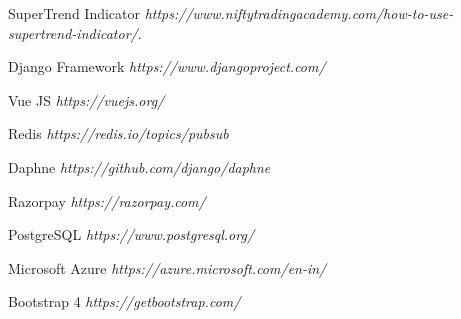 


\begin{thebibliography}{}
\thispagestyle{empty}
SuperTrend Indicator
\emph{https://www.niftytradingacademy.com/how-to-use-supertrend-indicator/}. 


Django Framework
\emph{https://www.djangoproject.com/}


Vue JS
\emph{https://vuejs.org/}

Redis
\emph{https://redis.io/topics/pubsub}

Daphne
\emph{https://github.com/django/daphne}


Razorpay
\emph{https://razorpay.com/}

PostgreSQL
\emph{https://www.postgresql.org/}

Microsoft Azure 
\emph{https://azure.microsoft.com/en-in/}


Bootstrap 4  
\emph{https://getbootstrap.com/}
\end{thebibliography}

